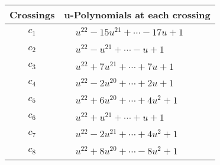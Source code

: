 \documentclass[1p]{elsarticle_modified}
\theoremstyle{definition}
\begin{document}
\begin{tabular}{m{50pt}|m{274pt}}
Crossings & \hspace{64pt}u-Polynomials at each crossing \\
\hline $$\begin{aligned}c_{1}\end{aligned}$$&$\begin{aligned}
&u^{22}-15 u^{21}+\cdots-17 u+1
\end{aligned}$\\
\hline $$\begin{aligned}c_{2}\end{aligned}$$&$\begin{aligned}
&u^{22}- u^{21}+\cdots- u+1
\end{aligned}$\\
\hline $$\begin{aligned}c_{3}\end{aligned}$$&$\begin{aligned}
&u^{22}+7 u^{21}+\cdots+7 u+1
\end{aligned}$\\
\hline $$\begin{aligned}c_{4}\end{aligned}$$&$\begin{aligned}
&u^{22}-2 u^{20}+\cdots+2 u+1
\end{aligned}$\\
\hline $$\begin{aligned}c_{5}\end{aligned}$$&$\begin{aligned}
&u^{22}+6 u^{20}+\cdots+4 u^2+1
\end{aligned}$\\
\hline $$\begin{aligned}c_{6}\end{aligned}$$&$\begin{aligned}
&u^{22}+u^{21}+\cdots+u+1
\end{aligned}$\\
\hline $$\begin{aligned}c_{7}\end{aligned}$$&$\begin{aligned}
&u^{22}-2 u^{21}+\cdots+4 u^2+1
\end{aligned}$\\
\hline $$\begin{aligned}c_{8}\end{aligned}$$&$\begin{aligned}
&u^{22}+8 u^{20}+\cdots-8 u^2+1
\end{aligned}$\\

\end{tabular}
\end{document}
